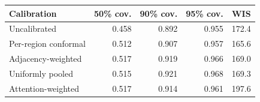 \begin{tabular}{lrrrr}
\hline
Calibration & 50{\%} cov. & 90{\%} cov. & 95{\%} cov. & WIS \\
\hline
Uncalibrated & 0.458 & 0.892 & 0.955 & 172.4 \\
Per-region conformal & 0.512 & 0.907 & 0.957 & 165.6 \\
Adjacency-weighted & 0.517 & 0.919 & 0.966 & 169.0 \\
Uniformly pooled & 0.515 & 0.921 & 0.968 & 169.3 \\
Attention-weighted & 0.517 & 0.914 & 0.961 & 197.6 \\
\hline
\end{tabular}
